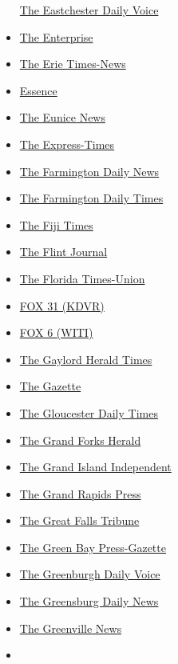 \begin{itemize}
  \href{https://dailyvoice.com/new-york/eastchester/}{The Eastchester
  Daily Voice}
\item
  \href{https://www.enterprisenews.com/}{The Enterprise}
\item
  \href{https://www.goerie.com/}{The Erie Times-News}
\item
  \href{https://www.essence.com/}{Essence}
\item
  \href{https://www.eunicetoday.com/}{The Eunice News}
\item
  \href{https://www.lehighvalleylive.com/}{The Express-Times}
\item
  \href{https://www.daily-times.com/}{The Farmington Daily News}
\item
  \href{https://www.daily-times.com/}{The Farmington Daily Times}
\item
  \href{https://www.fijitimes.com/}{The Fiji Times}
\item
  \href{https://www.mlive.com/flint/}{The Flint Journal}
\item
  \href{https://www.jacksonville.com/}{The Florida Times-Union}
\item
  \href{https://kdvr.com/}{FOX 31 (KDVR)}
\item
  \href{https://fox6now.com/}{FOX 6 (WITI)}
\item
  \href{https://www.petoskeynews.com/gaylord/}{The Gaylord Herald Times}
\item
  \href{https://www.thegazette.com/}{The Gazette}
\item
  \href{https://www.gloucestertimes.com/}{The Gloucester Daily Times}
\item
  \href{https://www.grandforksherald.com/}{The Grand Forks Herald}
\item
  \href{https://www.theindependent.com/}{The Grand Island Independent}
\item
  \href{https://www.mlive.com/grand-rapids-muskegon/}{The Grand Rapids
  Press}
\item
  \href{https://www.greatfallstribune.com/}{The Great Falls Tribune}
\item
  \href{https://www.greenbaypressgazette.com/}{The Green Bay
  Press-Gazette}
\item
  \href{https://dailyvoice.com/new-york/greenburgh/}{The Greenburgh
  Daily Voice}
\item
  \href{https://www.greensburgdailynews.com/}{The Greensburg Daily News}
\item
  \href{https://www.greenvilleonline.com/}{The Greenville News}
\item

\end{itemize}
